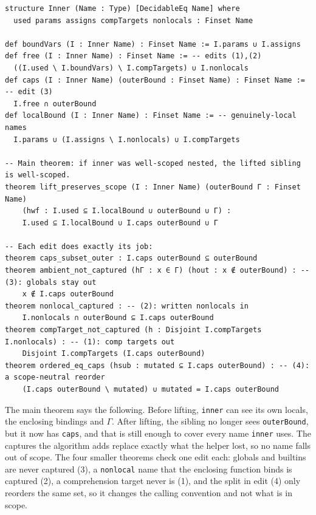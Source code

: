 \documentclass{article}
\newcommand{\code}{\lstinline}
\begin{document}
\begin{lstlisting}[style=lean,caption={The free-set computation and the scope-preservation theorem (statements; proofs omitted). All are \code{sorry}-free.},label={lst:lift-proof}]
structure Inner (Name : Type) [DecidableEq Name] where
  used params assigns compTargets nonlocals : Finset Name

def boundVars (I : Inner Name) : Finset Name := I.params ∪ I.assigns
def free (I : Inner Name) : Finset Name := -- edits (1),(2)
  ((I.used \ I.boundVars) \ I.compTargets) ∪ I.nonlocals
def caps (I : Inner Name) (outerBound : Finset Name) : Finset Name := -- edit (3)
  I.free ∩ outerBound
def localBound (I : Inner Name) : Finset Name := -- genuinely-local names
  I.params ∪ (I.assigns \ I.nonlocals) ∪ I.compTargets

-- Main theorem: if inner was well-scoped nested, the lifted sibling is well-scoped.
theorem lift_preserves_scope (I : Inner Name) (outerBound Γ : Finset Name)
    (hwf : I.used ⊆ I.localBound ∪ outerBound ∪ Γ) :
    I.used ⊆ I.localBound ∪ I.caps outerBound ∪ Γ

-- Each edit does exactly its job:
theorem caps_subset_outer : I.caps outerBound ⊆ outerBound
theorem ambient_not_captured (hΓ : x ∈ Γ) (hout : x ∉ outerBound) : -- (3): globals stay out
    x ∉ I.caps outerBound
theorem nonlocal_captured : -- (2): written nonlocals in
    I.nonlocals ∩ outerBound ⊆ I.caps outerBound
theorem compTarget_not_captured (h : Disjoint I.compTargets I.nonlocals) : -- (1): comp targets out
    Disjoint I.compTargets (I.caps outerBound)
theorem ordered_eq_caps (hsub : mutated ⊆ I.caps outerBound) : -- (4): a scope-neutral reorder
    (I.caps outerBound \ mutated) ∪ mutated = I.caps outerBound
\end{lstlisting}

The main theorem says the following. Before lifting, \code{inner} can see its own locals, the enclosing bindings and $\Gamma$. After lifting, the sibling no longer sees \code{outerBound}, but it now has \code{caps}, and that is still enough to cover every name \code{inner} uses. The captures the algorithm adds replace exactly what the helper lost, so no name falls out of scope. The four smaller theorems check one edit each: globals and builtins are never captured (3), a \code{nonlocal} name that the enclosing function binds is captured (2), a comprehension target never is (1), and the split in edit (4) only reorders the same set, so it changes the calling convention and not what is in scope. 
\end{document}
